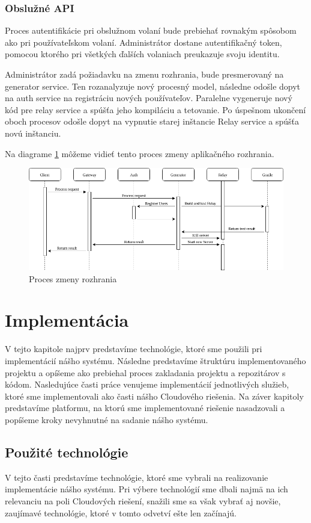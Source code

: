 \subsubsection{Obslužné API}
Proces autentifikácie pri obslužnom volaní bude prebiehať rovnakým spôsobom ako pri  používateľskom volaní. Administrátor dostane autentifikačný token, pomocou ktorého pri všetkých ďalších volaniach preukazuje svoju identitu.

Administrátor zadá požiadavku na zmenu rozhrania, bude presmerovaný na generator service. Ten rozanalyzuje nový procesný model, následne odošle dopyt na auth service na registráciu nových používateľov. Paralelne vygeneruje nový kód pre relay service a spúšťa jeho kompiláciu a tetovanie. Po úspešnom ukončení oboch procesov odošle dopyt na vypnutie starej inštancie Relay service a spúšťa novú inštanciu.

Na diagrame \ref{change_operation} môžeme vidieť tento proces zmeny aplikačného rozhrania.

\begin{figure}[!htbp]
	\centering
	\includegraphics[width=14cm]{img/api_operation_change.png}
	\caption{Proces zmeny rozhrania}
	\label{change_operation}
\end{figure}


\section{Implementácia}
V tejto kapitole najprv predstavíme technológie, ktoré sme použili pri implementácií nášho systému. Následne predstavíme štruktúru implementovaného projektu a opíšeme ako prebiehal proces zakladania projektu a repozitárov s kódom. 
Nasledujúce časti práce venujeme implementácií jednotlivých služieb, ktoré sme implementovali ako časti nášho Cloudového riešenia.
Na záver kapitoly predstavíme  platformu, na ktorú sme implementované riešenie nasadzovali a popíšeme kroky nevyhnutné na sadanie nášho systému.  

\subsection{Použité technológie}
V tejto časti predstavíme technológie, ktoré sme vybrali na realizovanie implementácie nášho systému. Pri výbere technológií sme dbali najmä na ich relevanciu na poli Cloudových riešení, snažili sme sa však vybrať aj novšie, zaujímavé technológie, ktoré v tomto odvetví ešte len začínajú. 

